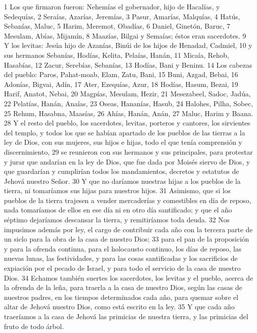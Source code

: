 1 Los que firmaron fueron: Nehemías el gobernador, hijo de Hacalías, y Sedequías,
2 Seraías, Azarías, Jeremías,
3 Pasur, Amarías, Malquías,
4 Hatús, Sebanías, Maluc,
5 Harim, Meremot, Obadías,
6 Daniel, Ginetón, Baruc,
7 Mesulam, Abías, Mijamín,
8 Maazías, Bilgai y Semaías; éstos eran sacerdotes.
9 Y los levitas: Jesúa hijo de Azanías, Binúi de los hijos de Henadad, Cadmiel,
10 y sus hermanos Sebanías, Hodías, Kelita, Pelaías, Hanán,
11 Micaía, Rehob, Hasabías,
12 Zacur, Serebías, Sebanías,
13 Hodías, Bani y Beninu.
14 Los cabezas del pueblo: Paros, Pahat-moab, Elam, Zatu, Bani,
15 Buni, Azgad, Bebai,
16 Adonías, Bigvai, Adín,
17 Ater, Ezequías, Azur,
18 Hodías, Hasum, Bezai,
19 Harif, Anatot, Nebai,
20 Magpías, Mesulam, Hezir,
21 Mesezabeel, Sadoc, Jadúa,
22 Pelatías, Hanán, Anaías,
23 Oseas, Hananías, Hasub,
24 Halohes, Pilha, Sobec,
25 Rehum, Hasabna, Maasías,
26 Ahías, Hanán, Anán,
27 Maluc, Harim y Baana.
28 Y el resto del pueblo, los sacerdotes, levitas, porteros y cantores, los sirvientes del templo, y todos los que se habían apartado de los pueblos de las tierras a la ley de Dios, con sus mujeres, sus hijos e hijas, todo el que tenía comprensión y discernimiento,
29 se reunieron con sus hermanos y sus principales, para protestar y jurar que andarían en la ley de Dios, que fue dada por Moisés siervo de Dios, y que guardarían y cumplirían todos los mandamientos, decretos y estatutos de Jehová nuestro Señor.
30 Y que no daríamos nuestras hijas a los pueblos de la tierra, ni tomaríamos sus hijas para nuestros hijos. 
31 Asimismo, que si los pueblos de la tierra trajesen a vender mercaderías y comestibles en día de reposo, nada tomaríamos de ellos en ese día ni en otro día santificado; y que el año séptimo dejaríamos descansar la tierra, y remitiríamos toda deuda. 
32 Nos impusimos además por ley, el cargo de contribuir cada año con la tercera parte de un siclo   para la obra de la casa de nuestro Dios; 
33 para el pan de la proposición y para la ofrenda continua, para el holocausto continuo, los días de reposo, las nuevas lunas, las festividades, y para las cosas santificadas y los sacrificios de expiación por el pecado de Israel, y para todo el servicio de la casa de nuestro Dios.
34 Echamos también suertes los sacerdotes, los levitas y el pueblo, acerca de la ofrenda de la leña, para traerla a la casa de nuestro Dios, según las casas de nuestros padres, en los tiempos determinados cada año, para quemar sobre el altar de Jehová nuestro Dios, como está escrito en la ley.
35 Y que cada año traeríamos a la casa de Jehová las primicias de nuestra tierra, y las primicias del fruto de todo árbol. 
